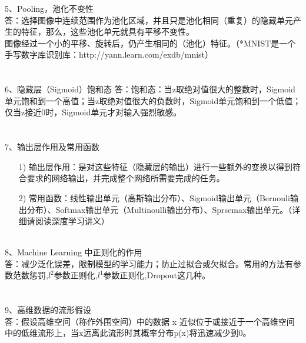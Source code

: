 \documentclass[UFT8]{ctexart}
\begin{document}
5、Pooling，池化不变性\\
答：选择图像中连续范围作为池化区域，并且只是池化相同（重复）的隐藏单元产生的特征，那么，这些池化单元就具有平移不变性。\\
图像经过一个小的平移、旋转后，仍产生相同的（池化）特征。（*MNIST是一个手写数字库识别库：http://yann.learn.com/exdb/mnist）\\
~\\
~\\
6、隐藏层（Sigmoid）饱和态
答：饱和态：当z取绝对值很大的整数时，Sigmoid单元饱和到一个高值；当z取绝对值很大的负数时，Sigmoid单元饱和到一个低值；仅当z接近0时，Sigmoid单元才对输入强烈敏感。\\
~\\
~\\
7、输出层作用及常用函数
\begin{itemize}
\item[1)] 输出层作用：是对这些特征（隐藏层的输出）进行一些额外的变换以得到符合要求的网络输出，并完成整个网络所需要完成的任务。
\item[2)] 常用函数：线性输出单元（高斯输出分布）、Sigmoid输出单元（Bernouli输出分布）、Softmax输出单元（Multinoulli输出分布）、Sprsemax输出单元。（详细请阅读深度学习讲义）
\end{itemize}
~\\
8、Machine Learning 中正则化的作用\\
答：减少泛化误差，限制模型的学习能力；防止过拟合或欠拟合。常用的方法有参数范数惩罚,$l^{2}$参数正则化,$l^{1}$参数正则化,Dropout这几种。\\
~\\
~\\
9、高维数据的流形假设\\
答：假设高维空间（称作外围空间）中的数据 x 近似位于或接近于一个高维空间中的低维流形上，当x远离此流形时其概率分布p(x)将迅速减少到0。\newpage
\end{document}
